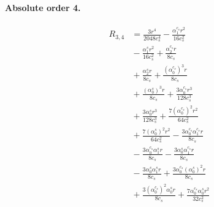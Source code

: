 \documentclass[10pt]{article}
\begin{document}
\paragraph{Absolute order 4.}
\begin{align*}
R_{3,4} &= \frac{3 r^{4}}{2048 c_{s}^{4}} - \frac{\alpha_{1}^{c_s} r^{2}}{16 c_{s}^{2}} \\
&{}  - \frac{\alpha_{1}^s r^{2}}{16 c_{s}^{2}} + \frac{\alpha_{2}^{c_s} r}{8 c_{s}} \\
&{}  + \frac{\alpha_{2}^s r}{8 c_{s}} + \frac{\left(\alpha_{0}^{c_s}\right)^{3} r}{8 c_{s}} \\
&{}  + \frac{\left(\alpha_{0}^s\right)^{3} r}{8 c_{s}} + \frac{3 \alpha_{0}^{c_s} r^{3}}{128 c_{s}^{3}} \\
&{}  + \frac{3 \alpha_{0}^s r^{3}}{128 c_{s}^{3}} + \frac{7 \left(\alpha_{0}^{c_s}\right)^{2} r^{2}}{64 c_{s}^{2}} \\
&{}  + \frac{7 \left(\alpha_{0}^s\right)^{2} r^{2}}{64 c_{s}^{2}} - \frac{3 \alpha_{0}^{c_s} \alpha_{1}^{c_s} r}{8 c_{s}} \\
&{}  - \frac{3 \alpha_{0}^{c_s} \alpha_{1}^s r}{8 c_{s}} - \frac{3 \alpha_{0}^s \alpha_{1}^{c_s} r}{8 c_{s}} \\
&{}  - \frac{3 \alpha_{0}^s \alpha_{1}^s r}{8 c_{s}} + \frac{3 \alpha_{0}^{c_s} \left(\alpha_{0}^s\right)^{2} r}{8 c_{s}} \\
&{}  + \frac{3 \left(\alpha_{0}^{c_s}\right)^{2} \alpha_{0}^s r}{8 c_{s}} + \frac{7 \alpha_{0}^{c_s} \alpha_{0}^s r^{2}}{32 c_{s}^{2}}
\end{align*}
\end{document}
